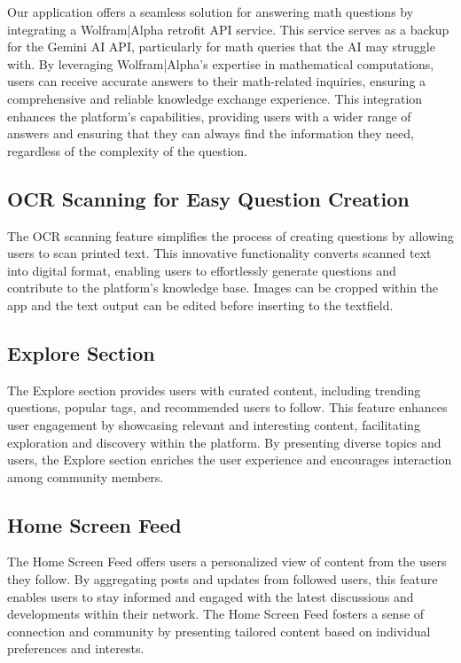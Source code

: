 Our application offers a seamless solution for answering math questions by integrating a Wolfram|Alpha retrofit API service. This service serves as a backup for the Gemini AI API, particularly for math queries that the AI may struggle with. By leveraging Wolfram|Alpha's expertise in mathematical computations, users can receive accurate answers to their math-related inquiries, ensuring a comprehensive and reliable knowledge exchange experience. This integration enhances the platform's capabilities, providing users with a wider range of answers and ensuring that they can always find the information they need, regardless of the complexity of the question.

\subsection{OCR Scanning for Easy Question Creation}

The OCR scanning feature simplifies the process of creating questions by allowing users to scan printed text. This innovative functionality converts scanned text into digital format, enabling users to effortlessly generate questions and contribute to the platform's knowledge base. Images can be cropped within the app and the text output can be edited before inserting to the textfield.

\subsection{Explore Section}

The Explore section provides users with curated content, including trending questions, popular tags, and recommended users to follow. This feature enhances user engagement by showcasing relevant and interesting content, facilitating exploration and discovery within the platform. By presenting diverse topics and users, the Explore section enriches the user experience and encourages interaction among community members.

\subsection{Home Screen Feed}

The Home Screen Feed offers users a personalized view of content from the users they follow. By aggregating posts and updates from followed users, this feature enables users to stay informed and engaged with the latest discussions and developments within their network. The Home Screen Feed fosters a sense of connection and community by presenting tailored content based on individual preferences and interests.


